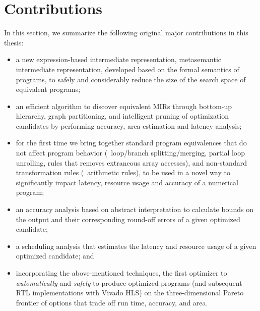 \section{Contributions}

In this section, we summarize the following original major contributions in
this thesis:
\begin{itemize}

    \item a new expression-based intermediate representation, metasemantic
    intermediate representation, developed based on the formal semantics of
    programs, to safely and considerably reduce the size of the search space of
    equivalent programs;

    \item an efficient algorithm to discover equivalent MIRs through bottom-up
    hierarchy, graph partitioning, and intelligent pruning of optimization
    candidates by performing accuracy, area estimation and latency analysis;

    \item for the first time we bring together standard program equivalences
    that do not affect program behavior (\eg~loop/branch splitting/merging,
    partial loop unrolling, rules that removes extraneous array accesses), and
    non-standard transformation rules (\eg~arithmetic rules), to be used in a
    novel way to significantly impact latency, resource usage and accuracy of a
    numerical program;

    \item an accuracy analysis based on abstract interpretation to calculate
    bounds on the output and their corresponding round-off errors of a given
    optimized candidate;

    \item a scheduling analysis that estimates the latency and resource usage
    of a given optimized candidate; and

    \item incorporating the above-mentioned techniques, the first optimizer to
    \emph{automatically} and \emph{safely} to produce optimized programs (and
    subsequent RTL implementations with Vivado HLS) on the three-dimensional
    Pareto frontier of options that trade off run time, accuracy, and area.

\end{itemize}
